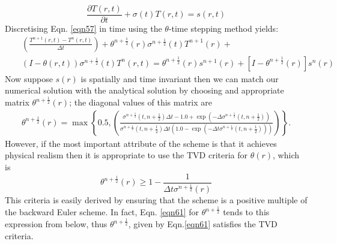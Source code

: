 \begin{equation}
\displaystyle\frac{\partial {T}\left({r},t\right)} {\partial t}+{\sigma}\left(t\right){T}\left({r},t\right)={s}\left({r},t\right)
\label{eqn57}
\end{equation}
Discretising Eqn. \ref{eqn57} in time using the $\theta$-time stepping method yields:
\begin{eqnarray}
&&\left(\displaystyle\frac{{{T}}^{n+1}\left({r},t\right)-{{T}}^{n}\left({r},t\right)}{\Delta t}\right)+{\theta}^{n+\frac{1}{2}}\left({r}\right){\sigma}^{n+\frac{1}{2}}\left(t\right){{T}}^{n+1}\left({r}\right)+   \nonumber \\
&& \left({I}-{\theta}\left({r},t\right)\right){\sigma}^{n+\frac{1}{2}}\left(t\right){{T}}^{n}\left({r},t\right)=  {\theta}^{n+\frac{1}{2}}\left({r}\right){s}^{n+1}\left({r}\right)+\left[{I}-{\theta}^{n+\frac{1}{2}}\left({r}\right)\right]{s}^{n}\left({r}\right)
\label{eqn60}
\end{eqnarray}
Now suppose ${s}\left({r}\right)$ is spatially and time invariant then we can match our numerical solution with the analytical solution by choosing and appropriate matrix ${\theta}^{n+\frac{1}{2}}\left({r}\right)$; the diagonal values of this matrix are
\begin{eqnarray}
{\theta}^{n+\frac{1}{2}}\left({r}\right) = \max \left\{ 
0.5,
\left(\displaystyle\frac
{{\sigma}^{n+\frac{1}{2}}\left(t,n+\frac{1}{2}\right)\Delta t-1.0+\exp\left(-\Delta{\sigma}^{n+\frac{1}{2}}\left(t,n+\frac{1}{2}\right)\right)} 
{{\sigma}^{n+\frac{1}{2}}\left(t,n+\frac{1}{2}\right)\Delta t\left(1.0-\exp\left(-\Delta t{\sigma}^{n+\frac{1}{2}}\left(t,n+\frac{1}{2}\right) \right)\right) }
\right)
\right\}. 
\label{eqn61}
\end{eqnarray} 
However, if the most important attribute of the scheme is that it achieves physical realism then it is appropriate to use the TVD criteria for ${\theta}\left({r}\right)$, which is
\begin{equation}
{\theta}^{n+\frac{1}{2}} \left({r}\right) \geq 1-\displaystyle\frac{1}{\Delta t {\sigma}^{n+\frac{1}{2}}\left({r}\right)}
\label{eqn62}
\end{equation}
This criteria is easily derived by ensuring that the scheme is a positive multiple of the backward Euler scheme.  In fact, Eqn. \ref{eqn61} for $\theta^{n+\frac{1}{2}}$ tends to this expression from below, thus $\theta^{n+\frac{1}{2}}$, given by Eqn.\ref{eqn61} satisfies the TVD criteria.

